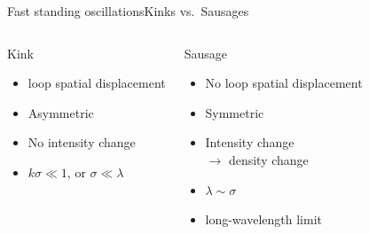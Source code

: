 \documentclass[table]{beamer}
\begin{document}
\begin{frame}{Fast standing oscillations}{Kinks vs.\ Sausages}
\begin{columns}
    \begin{block}{Kink}
        \begin{itemize}
            \item loop spatial displacement
            \item Asymmetric
            \item No intensity change
            \item $k\sigma \ll 1$, or $\sigma\ll\lambda$
        \end{itemize}
    \end{block}
    \begin{block}{Sausage}
        \begin{itemize}
            \item No loop spatial displacement
            \item Symmetric
            \item Intensity change\\ $\rightarrow$ density change
            \item $\lambda\sim\sigma$
            \item long-wavelength limit
        \end{itemize}
    \end{block}
\end{columns}
\end{frame}%
\end{document}
